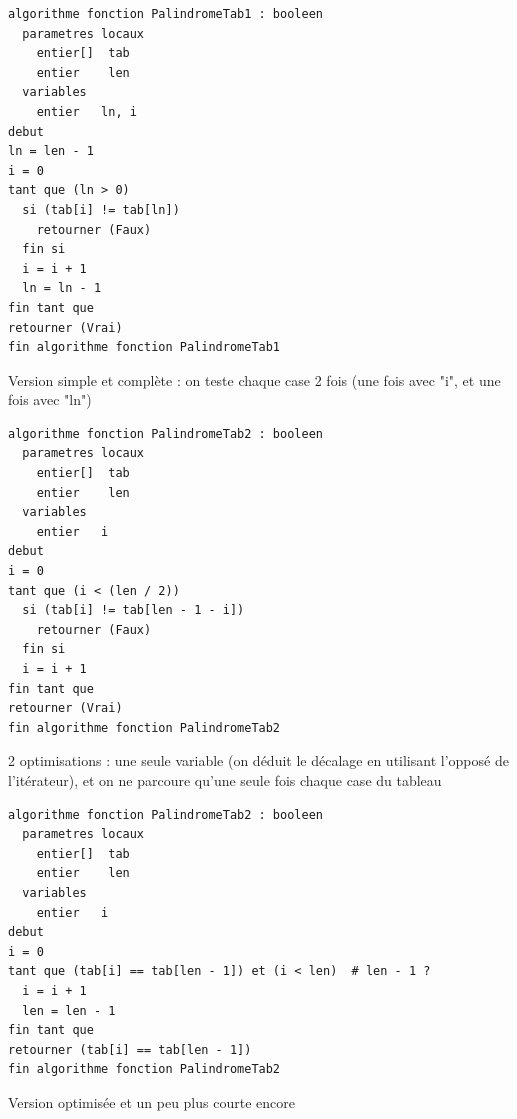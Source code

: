 \documentclass[11pt,a4paper]{article}
\begin{document}


\begin{table}[ht!]
  \centering
\begin{lstlisting}[style=algorithmique]
algorithme fonction PalindromeTab1 : booleen
  parametres locaux
    entier[]  tab
    entier    len
  variables
    entier   ln, i
debut
ln = len - 1
i = 0
tant que (ln > 0)
  si (tab[i] != tab[ln])
    retourner (Faux)
  fin si
  i = i + 1
  ln = ln - 1
fin tant que
retourner (Vrai)
fin algorithme fonction PalindromeTab1 \end{lstlisting}
  \caption{Version simple et complète : on teste chaque case 2 fois (une fois avec "i", et une fois avec "ln")}
\end{table}


\begin{table}[ht!]
  \centering
\begin{lstlisting}[style=algorithmique]
algorithme fonction PalindromeTab2 : booleen
  parametres locaux
    entier[]  tab
    entier    len
  variables
    entier   i
debut
i = 0
tant que (i < (len / 2))
  si (tab[i] != tab[len - 1 - i])
    retourner (Faux)
  fin si
  i = i + 1
fin tant que
retourner (Vrai)
fin algorithme fonction PalindromeTab2 \end{lstlisting}
  \caption{2 optimisations : une seule variable (on déduit le décalage en utilisant l'opposé de l'itérateur), et on ne parcoure qu'une seule fois chaque case du tableau}
\end{table}


\begin{table}[ht!]
  \centering
\begin{lstlisting}[style=algorithmique]
algorithme fonction PalindromeTab2 : booleen
  parametres locaux
    entier[]  tab
    entier    len
  variables
    entier   i
debut
i = 0
tant que (tab[i] == tab[len - 1]) et (i < len)  # len - 1 ?
  i = i + 1
  len = len - 1
fin tant que
retourner (tab[i] == tab[len - 1])
fin algorithme fonction PalindromeTab2 \end{lstlisting}
  \caption{Version optimisée et un peu plus courte encore}
\end{table}


\bigskip

\end{document}
